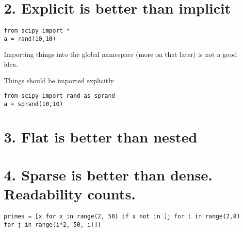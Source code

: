 \section*{2. Explicit is better than implicit}
\begin{lstlisting}
from scipy import *
a = rand(10,10)
\end{lstlisting}

Importing things into the global namespace (more on that later) is not a good idea.

Things should be imported explicitly
\begin{lstlisting}
from scipy import rand as sprand
a = sprand(10,10)
\end{lstlisting}

\section*{3. Flat is better than nested}

\section*{4. Sparse is better than dense. Readability counts.}
\begin{lstlisting}
primes = [x for x in range(2, 50) if x not in [j for i in range(2,8) for j in range(i*2, 50, i)]]
\end{lstlisting}

